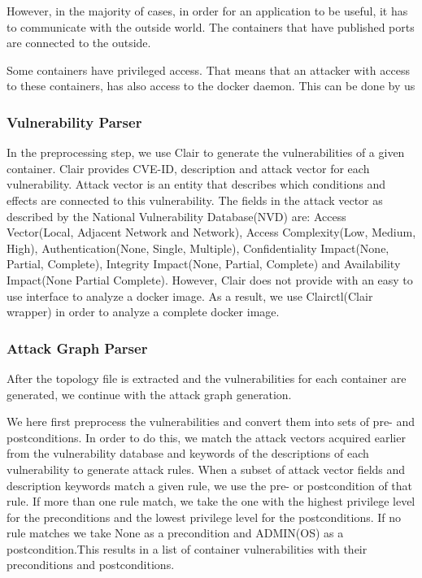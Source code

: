 \documentclass[letterpaper, 10 pt, conference]{ieeeconf}  %
\begin{document}
However, in the majority of cases, in order for an application to be useful, it has to communicate with the outside world. The containers that have published ports are connected to the outside.

Some containers have privileged access. That means that an attacker with access to these containers, has also access to the docker daemon. This can be done by us


\subsubsection{Vulnerability Parser}
In the preprocessing step, we use Clair to generate the vulnerabilities of a given container. Clair provides CVE-ID, description and attack vector for each vulnerability. Attack vector is an entity that describes which conditions and effects are connected to this vulnerability. The fields in the attack vector as described by the National Vulnerability Database(NVD) are: Access Vector(Local, Adjacent Network and Network), Access Complexity(Low, Medium, High), Authentication(None, Single, Multiple), Confidentiality Impact(None, Partial, Complete), Integrity Impact(None, Partial, Complete) and Availability Impact(None Partial Complete). However, Clair does not provide with an easy to use interface to analyze a docker image. As a result, we use Clairctl(Clair wrapper) in order to analyze a complete docker image.


\subsubsection{Attack Graph Parser}
After the topology file is extracted and the vulnerabilities for each container are generated, we continue with the attack graph generation.

We here first preprocess the vulnerabilities and convert them into sets of pre- and postconditions. In order to do this, we match the attack vectors acquired earlier from the vulnerability database and keywords of the descriptions of each vulnerability to generate attack rules. When a subset of attack vector fields and description keywords match a given rule, we use the pre- or postcondition of that rule. If more than one rule match, we take the one with the highest privilege level for the preconditions and the lowest privilege level for the postconditions. If no rule matches we take None as a precondition and ADMIN(OS) as a postcondition.This results in a list of container vulnerabilities with their preconditions and postconditions.
\end{document}
